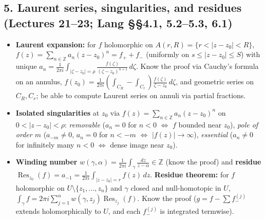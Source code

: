 \documentclass[12pt, reqno]{amsart}
\theoremstyle{definition}
\numberwithin{equation}{subsection}
\DeclareMathOperator{\Res}{Res}
\newcommand{\zee}{\mathbb{Z}}
\renewcommand{\Im}{\mathrm{Im}}
\begin{document}
\subsection*{5. Laurent series, singularities, and residues \normalfont (Lectures 21--23; Lang \S\S4.1, 5.2--5.3, 6.1)}
\begin{itemize}[leftmargin=*]
\item \textbf{Laurent expansion:} for $f$ holomorphic on $A(r,R)=\{r<|z-z_0|<R\}$, $f(z)=\sum_{n\in\zee}a_n(z-z_0)^n=f_++f_-$
      (uniformly on $s\le|z-z_0|\le S$) with unique $a_n=\frac{1}{2\pi i}\int_{|\zeta-z_0|=\rho}\frac{f(\zeta)}{(\zeta-z_0)^{n+1}}\,d\zeta$.
      Know the proof via Cauchy's formula on an annulus, $f(z_0)=\frac{1}{2\pi i}(\int_{C_R}-\int_{C_r})\frac{f(\zeta)}{\zeta-z_0}\,d\zeta$,
      and geometric series on $C_R,C_r$; be able to compute Laurent series on annuli via partial fractions.
\item \textbf{Isolated singularities} at $z_0$ via $f(z)=\sum_{n\in\zee}a_n(z-z_0)^n$ on $0<|z-z_0|<\rho$:
      \emph{removable} ($a_n=0$ for $n<0$ $\Leftrightarrow$ $f$ bounded near $z_0$),
      \emph{pole of order $m$} ($a_{-m}\ne0$, $a_n=0$ for $n<-m$ $\Leftrightarrow$ $|f(z)|\to\infty$),
      \emph{essential} ($a_n\ne0$ for infinitely many $n<0$ $\Leftrightarrow$ dense image near $z_0$).
\item \textbf{Winding number} $w(\gamma,\alpha)=\frac{1}{2\pi i}\int_\gamma\frac{dz}{z-\alpha}\in\zee$ (know the proof)
      and \textbf{residue} $\Res_{z_0}(f)=a_{-1}=\frac{1}{2\pi i}\int_{|z-z_0|=r}f(z)\,dz$.
      \textbf{Residue theorem:} for $f$ holomorphic on $U\setminus\{z_1,\dots,z_n\}$ and $\gamma$ closed and null-homotopic in $U$,
      $\int_\gamma f=2\pi i\sum_{j=1}^n w(\gamma,z_j)\Res_{z_j}(f)$.
      Know the proof ($g=f-\sum f_-^{(j)}$ extends holomorphically to $U$, and each $f_-^{(j)}$ is integrated termwise).
\end{itemize}
\end{document}
